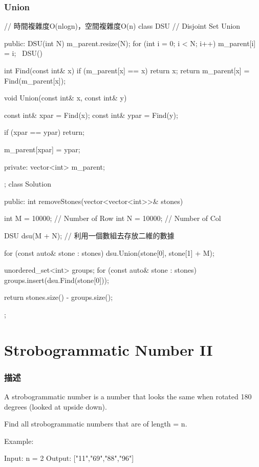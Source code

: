 \subsubsection{Union}
\begin{Code}
// 時間複雜度O(nlogn)，空間複雜度O(n)
class DSU // Disjoint Set Union
{
public:
    DSU(int N)
    {
        m_parent.resize(N);
        for (int i = 0; i < N; i++) m_parent[i] = i;
    }
    ~DSU() {}

    int Find(const int& x)
    {
        if (m_parent[x] == x) return x;
        return m_parent[x] = Find(m_parent[x]);
    }

    void Union(const int& x, const int& y)
    {
        const int& xpar = Find(x);
        const int& ypar = Find(y);

        if (xpar == ypar) return;

        m_parent[xpar] = ypar;
    }
private:
    vector<int> m_parent;
};
class Solution {
public:
    int removeStones(vector<vector<int>>& stones) {
        int M = 10000; // Number of Row
        int N = 10000; // Number of Col

        DSU dsu(M + N); // 利用一個數組去存放二維的數據

        for (const auto& stone : stones)
            dsu.Union(stone[0], stone[1] + M);

        unordered_set<int> groups;
        for (const auto& stone : stones)
            groups.insert(dsu.Find(stone[0]));

        return stones.size() - groups.size();
    }
};
\end{Code}

\section{Strobogrammatic Number II} %
\label{sec:strobogrammatic-number-ii}


\subsubsection{描述}
A strobogrammatic number is a number that looks the same when rotated 180 degrees (looked at upside down).

Find all strobogrammatic numbers that are of length = n.

Example:
\begin{Code}
Input:  n = 2
Output: ["11","69","88","96"]
\end{Code}

